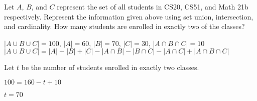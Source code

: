 \documentclass[solution, letterpaper]{cs20inclass}
\begin{document}
\subproblem Let $A$, $B$, and $C$ represent the set of all students in CS20, CS51, and Math 21b respectively. Represent the information given above using set union, intersection, and cardinality.
\subproblem How many students are enrolled in exactly two of the classes?

\begin{solution}
\subsolution $|A \cup B \cup C| = 100$, $|A| = 60$, $|B| = 70$, $|C| = 30$, $|A \cap B \cap C| = 10$
\subsolution $|A \cup B \cup C| = |A| + |B| + |C| - |A \cap B| - |B \cap C| - |A \cap C| + |A \cap B \cap C|$

Let $t$ be the number of students enrolled in exactly two classes.

$100 = 160 - t + 10$

$t = 70$
\end{solution}
\end{document}
